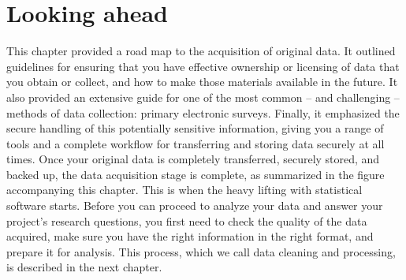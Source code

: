 \documentclass[
]{book}
\begin{document}
\hypertarget{looking-ahead-4}{%
\section*{Looking ahead}\label{looking-ahead-4}}

This chapter provided a road map to the acquisition of original data.
It outlined guidelines for ensuring that you have effective ownership
or licensing of data that you obtain or collect,
and how to make those materials available in the future.
It also provided an extensive guide for one of the most common --
and challenging --
methods of data collection: primary electronic surveys.
Finally, it emphasized the secure handling of this potentially sensitive information,
giving you a range of tools and a complete workflow
for transferring and storing data securely at all times.
Once your original data is completely transferred, securely stored, and backed up,
the data acquisition stage is complete, as
summarized in the figure accompanying this chapter.
This is when the heavy lifting with statistical software starts.
Before you can proceed to analyze your data
and answer your project's research questions,
you first need to check the quality of the data acquired,
make sure you have the right information in the right format, and prepare it for analysis.
This process, which we call data cleaning and processing,
is described in the next chapter.
\end{document}
